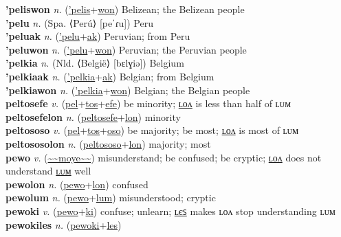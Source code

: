 \textbf{'peliswon} \textit{n.} (\hyperref['pelis]{'pelis}+\hyperref[won]{won})
Belizean; the Belizean people \label{'peliswon} \\
\textbf{'pelu} \textit{n.} (Spa. ⟨Perú⟩ [peˈɾu])
Peru \label{'pelu} \\
\textbf{'peluak} \textit{n.} (\hyperref['pelu]{'pelu}+\hyperref[ak]{ak})
Peruvian; from Peru \label{'peluak} \\
\textbf{'peluwon} \textit{n.} (\hyperref['pelu]{'pelu}+\hyperref[won]{won})
Peruvian; the Peruvian people \label{'peluwon} \\
\textbf{'pelkia} \textit{n.} (Nld. ⟨België⟩ [bɛlɣiə])
Belgium \label{'pelkia} \\
\textbf{'pelkiaak} \textit{n.} (\hyperref['pelkia]{'pelkia}+\hyperref[ak]{ak})
Belgian; from Belgium \label{'pelkiaak} \\
\textbf{'pelkiawon} \textit{n.} (\hyperref['pelkia]{'pelkia}+\hyperref[won]{won})
Belgian; the Belgian people \label{'pelkiawon} \\
\textbf{peltosefe} \textit{v.} (\hyperref[pel]{pel}+\hyperref[tos]{tos}+\hyperref[efe]{efe})
be minority; \hyperref[peltosefelon]{ʟᴏᴧ} is less than half of ʟᴜᴍ \label{peltosefe} \\
\textbf{peltosefelon} \textit{n.} (\hyperref[peltosefe]{peltosefe}+\hyperref[lon]{lon})
minority \label{peltosefelon} \\
\textbf{peltososo} \textit{v.} (\hyperref[pel]{pel}+\hyperref[tos]{tos}+\hyperref[oso]{oso})
be majority; be most; \hyperref[peltososolon]{ʟᴏᴧ} is most of ʟᴜᴍ \label{peltososo} \\
\textbf{peltososolon} \textit{n.} (\hyperref[peltososo]{peltososo}+\hyperref[lon]{lon})
majority; most \label{peltososolon} \\
\textbf{pewo} \textit{v.} (\hyperref[moye]{\~{}\~{}moye\~{}\~{}})
misunderstand; be confused; be cryptic; \hyperref[pewolon]{ʟᴏᴧ} does not understand \hyperref[pewolum]{ʟᴜᴍ} well \label{pewo} \\
\textbf{pewolon} \textit{n.} (\hyperref[pewo]{pewo}+\hyperref[lon]{lon})
confused \label{pewolon} \\
\textbf{pewolum} \textit{n.} (\hyperref[pewo]{pewo}+\hyperref[lum]{lum})
misunderstood; cryptic \label{pewolum} \\
\textbf{pewoki} \textit{v.} (\hyperref[pewo]{pewo}+\hyperref[ki]{ki})
confuse; unlearn; \hyperref[pewokiles]{ʟєꜱ} makes ʟᴏᴧ stop understanding ʟᴜᴍ \label{pewoki} \\
\textbf{pewokiles} \textit{n.} (\hyperref[pewoki]{pewoki}+\hyperref[les]{les})
